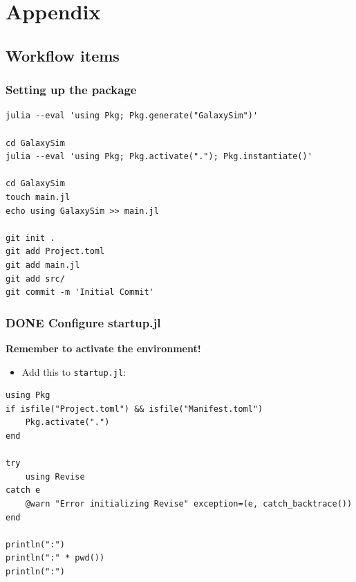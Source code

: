 \documentclass[11pt]{article}
\begin{document}


\section{Appendix}
\label{sec:orgf06ae7d}
\subsection{Workflow items}
\label{sec:org882e9a4}
\subsubsection{Setting up the package}
\label{sec:orgdf1bf1a}

\begin{verbatim}
julia --eval 'using Pkg; Pkg.generate("GalaxySim")'

cd GalaxySim
julia --eval 'using Pkg; Pkg.activate("."); Pkg.instantiate()'

cd GalaxySim
touch main.jl
echo using GalaxySim >> main.jl

git init .
git add Project.toml
git add main.jl
git add src/
git commit -m 'Initial Commit'
\end{verbatim}
\subsubsection{{\bfseries\sffamily DONE} Configure startup.jl}
\label{sec:org2e1f5a3}
\textbf{Remember to activate the environment!}
\begin{itemize}
\item Add this to \texttt{startup.jl}:
\end{itemize}

\begin{verbatim}
using Pkg
if isfile("Project.toml") && isfile("Manifest.toml")
    Pkg.activate(".")
end

try
    using Revise
catch e
    @warn "Error initializing Revise" exception=(e, catch_backtrace())
end

println(":")
println(":" * pwd())
println(":")
\end{verbatim}
\end{document}
